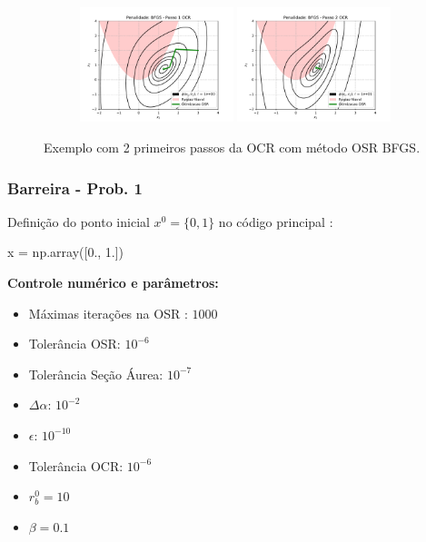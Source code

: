 \documentclass[10pt, a4paper]{article}
\begin{document}
\begin{figure}[H]
  \centering
  \begin{subfigure}[b]{\textwidth}
    \includegraphics[width=0.49\textwidth]{fig_p1/Penalidade_BFGS_1.pdf}
    \includegraphics[width=0.49\textwidth]{fig_p1/Penalidade_BFGS_2.pdf}
  \end{subfigure}
  \caption{Exemplo com 2 primeiros passos da OCR com método OSR BFGS. }
\end{figure}

\subsubsection{Barreira - Prob. 1}

Definição do ponto inicial $x^0 = \{0,1\}$ no código principal :

\begin{python}
  x = np.array([0., 1.])
\end{python}

\vspace{3mm}
\textbf{Controle numérico e parâmetros:}

\begin{itemize}
  \item Máximas iterações na OSR : $1000$
  \item Tolerância OSR: $10^{-6}$
  \item Tolerância Seção Áurea: $10^{-7}$
  \item $\Delta \alpha$: $10^{-2}$
  \item $\epsilon$: $10^{-10}$
  \item Tolerância OCR: $10^{-6}$
  \item $r_b^0 = 10$
  \item $\beta = 0.1$
\end{itemize}
\end{document}
